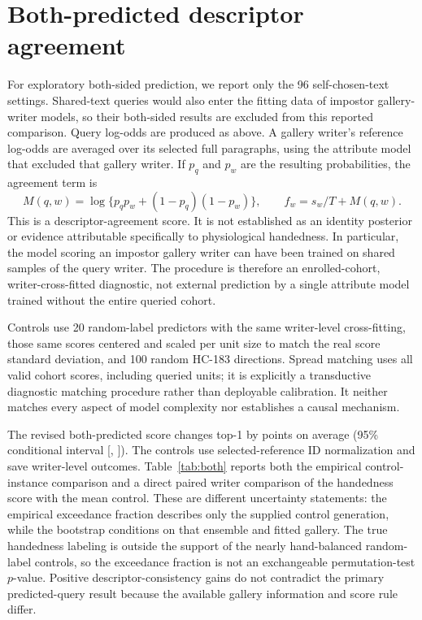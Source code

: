 \documentclass[10pt,a4paper]{article}
\begin{document}
\section{Both-predicted descriptor agreement}
\label{sec:both}
For exploratory both-sided prediction, we report only the 96 self-chosen-text settings. Shared-text queries would also enter the fitting data of impostor gallery-writer models, so their both-sided results are excluded from this reported comparison. Query log-odds are produced as above. A gallery writer's reference log-odds are averaged over its selected full paragraphs, using the attribute model that excluded that gallery writer. If $p_q$ and $p_w$ are the resulting probabilities, the agreement term is
\begin{equation}
 M(q,w)=\log\{p_qp_w+(1-p_q)(1-p_w)\},\qquad
 f_w=s_w/T+M(q,w).
\end{equation}
This is a descriptor-agreement score. It is not established as an identity posterior or evidence attributable specifically to physiological handedness. In particular, the model scoring an impostor gallery writer can have been trained on shared samples of the query writer. The procedure is therefore an enrolled-cohort, writer-cross-fitted diagnostic, not external prediction by a single attribute model trained without the entire queried cohort.

Controls use 20 random-label predictors with the same writer-level cross-fitting, those same scores centered and scaled per unit size to match the real score standard deviation, and 100 random HC-183 directions. Spread matching uses all valid cohort scores, including queried units; it is explicitly a transductive diagnostic matching procedure rather than deployable calibration. It neither matches every aspect of model complexity nor establishes a causal mechanism.

The revised both-predicted score changes top-1 by \rBothGain{} points on average (95\% conditional interval [\rBothLo, \rBothHi]). The controls use selected-reference ID normalization and save writer-level outcomes. Table~\ref{tab:both} reports both the empirical control-instance comparison and a direct paired writer comparison of the handedness score with the mean control. These are different uncertainty statements: the empirical exceedance fraction describes only the supplied control generation, while the bootstrap conditions on that ensemble and fitted gallery. The true handedness labeling is outside the support of the nearly hand-balanced random-label controls, so the exceedance fraction is not an exchangeable permutation-test $p$-value. Positive descriptor-consistency gains do not contradict the primary predicted-query result because the available gallery information and score rule differ.
\end{document}
